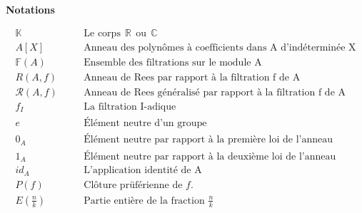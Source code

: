 \newpage

\begin{center}
	\LARGE{\textbf{Notations}}
\end{center}


\begin{eqnarray*}
	\mathbb{K} & & \quad \text{Le  corps} \ \ \mathbb{R} \ \ \text{ou} \ \ \mathbb{C}\\
	A[X] & & \quad \text{Anneau des polynômes à coefficients dans A d'indéterminée X}\\
	\mathbb{F}(A) & & \quad \text{Ensemble des filtrations sur le module A}\\
	R(A,f) & & \quad \text{Anneau de Rees par rapport à la filtration f de A}\\
	\mathcal{R}(A,f) & & \quad \text{Anneau de Rees généralisé par rapport à la filtration f de A}\\
	f_{I} & & \quad \text{La filtration I-adique} \\
	e & & \quad \text{Élément neutre d'un groupe} \\
	0_{A} & & \quad \text{Élément neutre par rapport à la première loi de l'anneau} \\
	1_{A} & & \quad \text{Élément neutre par rapport à la deuxième loi de l'anneau} \\
	id_{A} & & \quad \text{L'application identité de A} \\
	P(f) & & \quad \text{Clôture prüférienne de $f$.} \\
	E(\frac{n}{k}) & & \quad \text{Partie entière de la fraction $\frac{n}{k}$ } \\
\end{eqnarray*}